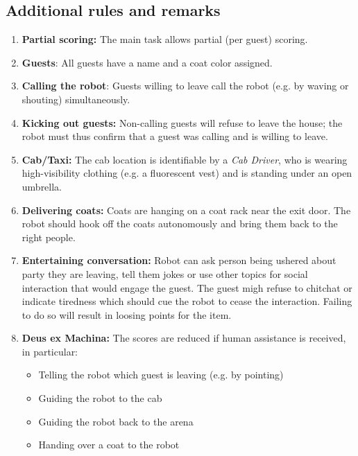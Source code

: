 \subsection*{Additional rules and remarks}
\begin{enumerate}[nosep]
	\item \textbf{Partial scoring:} The main task allows partial (per guest) scoring.

	\item \textbf{Guests}: All guests have a name and a coat color assigned.

	\item \textbf{Calling the robot}: Guests willing to leave call the robot (e.g. by waving or shouting) simultaneously.

	\item \textbf{Kicking out guests:} Non-calling guests will refuse to leave the house; the robot must thus confirm that a guest was calling and is willing to leave.


	\item \textbf{Cab/Taxi:} The cab location is identifiable by a \emph{Cab Driver}, who is wearing high-visibility clothing (e.g. a fluorescent vest) and is standing under an open umbrella.

	\item \textbf{Delivering coats:} Coats are hanging on a coat rack near the exit door.
	The robot should hook off the coats autonomously and bring them back to the right people.
	
	\item \textbf{Entertaining conversation:} Robot can ask person being ushered about party they are leaving, tell them jokes or use other topics
	for social interaction that would engage the guest. The guest migh refuse to chitchat or indicate tiredness which should cue the robot
	to cease the interaction. Failing to do so will result in loosing points for the item.

	\item \textbf{Deus ex Machina:} The scores are reduced if human assistance is received, in particular:
	\begin{itemize}
		\item Telling the robot which guest is leaving (e.g. by pointing)
		\item Guiding the robot to the cab
		\item Guiding the robot back to the arena
		\item Handing over a coat to the robot
	\end{itemize}
\end{enumerate}


